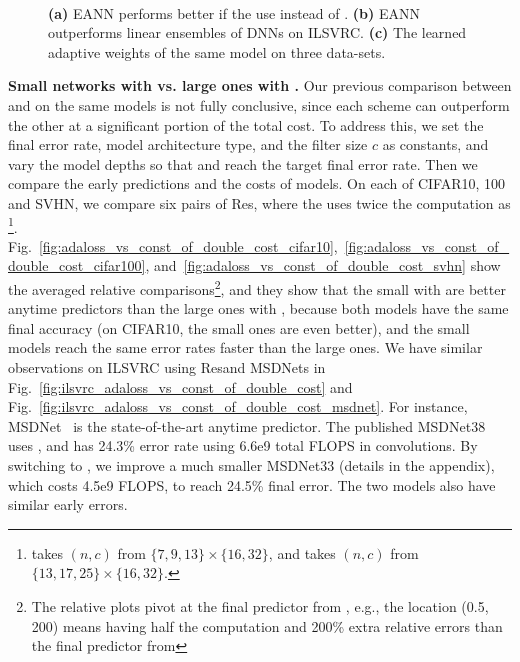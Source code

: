 \begin{figure}[t]
    \centering
    ~
    
    \caption{ \textbf{(a)} EANN performs better if the \anns use \adaloss instead of \const. 
    \textbf{(b)} EANN outperforms linear ensembles of DNNs on ILSVRC.
    \textbf{(c)} The learned adaptive weights of the same model on three data-sets.
    }
\end{figure}


\textbf{Small networks with \adaloss vs. large ones with \const.} 
Our previous comparison between \adaloss and \const on the same models is not fully conclusive, since each scheme can outperform the other at a significant portion of the total cost. To address this, we set the final error rate, model architecture type, and the filter size $c$ as constants, and vary the model depths so that \adaloss and \const reach the target final error rate. Then we compare the early predictions and the costs of models. 
On each of CIFAR10, 100 and SVHN, we compare six pairs of Res\anns, where the \const uses twice the computation as \adaloss\footnote{\adaloss takes $(n,c)$ from $\{7,9,13\} \times \{16, 32\}$, and \const takes $(n,c)$ from $\{13,17,25\} \times \{16, 32\}$.}. Fig.~\ref{fig:adaloss_vs_const_of_double_cost_cifar10},~\ref{fig:adaloss_vs_const_of_double_cost_cifar100}, and~\ref{fig:adaloss_vs_const_of_double_cost_svhn} show the averaged relative comparisons\footnote{The relative plots pivot at the final predictor from \adaloss, e.g., the location (0.5, 200) means having half the computation and 200\% extra relative errors than the final predictor from \adaloss}, and they show that the small \anns with \adaloss are better anytime predictors than the large ones with \const, because both models have the same final accuracy (on CIFAR10, the small ones are even better), and the small models reach the same error rates faster than the large ones. We have similar observations on ILSVRC using Res\anns and MSDNets in Fig.~\ref{fig:ilsvrc_adaloss_vs_const_of_double_cost} and Fig.~\ref{fig:ilsvrc_adaloss_vs_const_of_double_cost_msdnet}.
For instance, MSDNet~\cite{msdense} is the state-of-the-art anytime predictor. The published MSDNet38 uses \const, and has 24.3\% error rate using 6.6e9 total FLOPS in convolutions. By switching to \adaloss, we improve a much smaller MSDNet33 (details in the appendix), which costs 4.5e9 FLOPS, to reach 24.5\% final error. The two models also have similar early errors. 


